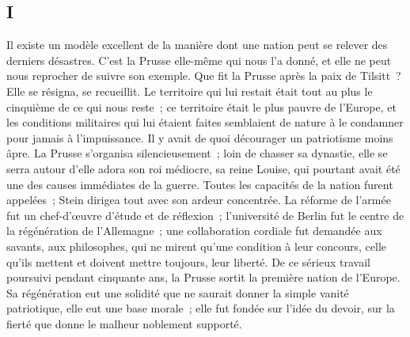 \documentclass[french,twoside]{book} %
\begin{document}
\subsection[{I}]{I}
\noindent Il existe un modèle excellent de la manière dont une nation peut se relever des derniers désastres. C’est la Prusse elle-même qui nous l’a donné, et elle ne peut nous reprocher de suivre son exemple. Que fit la Prusse après la paix de Tilsitt ? Elle se résigna, se recueillit. Le territoire qui lui restait était tout au plus le cinquième de ce qui nous reste ; ce territoire était le plus pauvre de l’Europe, et les conditions militaires qui lui étaient faites semblaient de nature à le condamner pour jamais à l’impuissance. Il y avait de quoi décourager un patriotisme moins âpre. La Prusse s’organisa silencieusement ; loin de chasser sa dynastie, elle se serra autour d’elle adora son roi médiocre, sa reine Louise, qui pourtant avait été une des causes immédiates de la guerre. Toutes les capacités de la nation furent appelées ; Stein dirigea tout avec son ardeur concentrée. La réforme de l’armée fut un chef-d’œuvre d’étude et de réflexion ; l’université de Berlin fut le centre de la régénération de l’Allemagne ; une collaboration cordiale fut demandée aux savants, aux philosophes, qui ne mirent qu’une condition à leur concours, celle qu’ils mettent et doivent mettre toujours, leur liberté. De ce sérieux travail poursuivi pendant cinquante ans, la Prusse sortit la première nation de l’Europe. Sa régénération eut une solidité que ne saurait donner la simple vanité patriotique, elle eut une base morale ; elle fut fondée sur l’idée du devoir, sur la fierté que donne le malheur noblement supporté.\par
\end{document}
